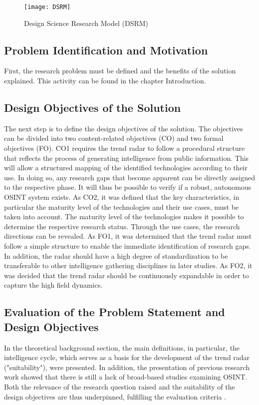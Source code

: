 \documentclass[10pt]{article}
\begin{document}
\begin{figure*}[thb]
    \centering
    \texttt{[image: DSRM]}
    \caption{Design Science Research Model (DSRM)}
    \label{fig: DSRM}
\end{figure*}

\subsection{Problem Identification and Motivation}

First, the research problem must be defined and the benefits of the solution explained.
This activity can be found in the chapter Introduction.

\subsection{Design Objectives of the Solution}

The next step is to define the design objectives of the solution. The
objectives can be divided into two content-related objectives (CO) and
two formal objectives (FO). CO1 requires the trend radar to follow a procedural
structure that reflects the process of generating intelligence from
public information. This will allow a structured mapping of the
identified technologies according to their use. In doing so, any
research gaps that become apparent can be directly assigned to the
respective phase. It will thus be possible to verify if a robust,
autonomous OSINT system exists. As CO2, it was defined that the key
characteristics, in particular the maturity level of the technologies
and their use cases, must be taken into account. The maturity level of
the technologies makes it possible to determine the respective research status.
Through the use cases, the research directions can be
revealed. As FO1, it was determined that the trend radar must follow
a simple structure to enable the immediate identification of research gaps. In addition,
the radar should have a high degree of standardization to be
transferable to other intelligence gathering disciplines in later
studies. As FO2, it was decided that the trend radar should be continuously expandable
in order to capture the high field dynamics.

\subsection{Evaluation of the Problem Statement and Design Objectives}

In the theoretical background section, the main definitions, in
particular, the intelligence cycle, which serves as a basis for the
development of the trend radar ("suitability"), were presented. In
addition, the presentation of previous research work showed that there
is still a lack of broad-based studies examining OSINT. Both the
relevance of the research question raised and the suitability of the
design objectives are thus underpinned, fulfilling the
evaluation criteria \cite{Sonnenberg.2012}.
\end{document}
